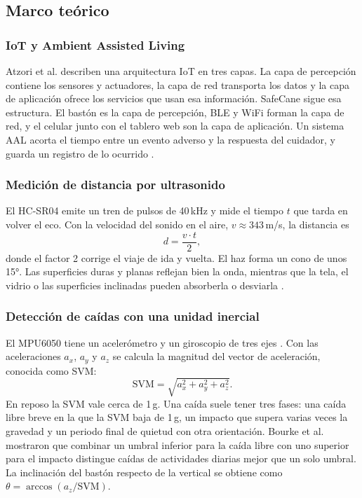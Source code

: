\documentclass[conference,a4paper]{IEEEtran}
\begin{document}
\subsection{Marco teórico}

\subsubsection{IoT y Ambient Assisted Living}
Atzori et al. \cite{atzori} describen una arquitectura IoT en tres capas. La capa de percepción contiene los sensores y actuadores, la capa de red transporta los datos y la capa de aplicación ofrece los servicios que usan esa información. SafeCane sigue esa estructura. El bastón es la capa de percepción, BLE y WiFi forman la capa de red, y el celular junto con el tablero web son la capa de aplicación. Un sistema AAL acorta el tiempo entre un evento adverso y la respuesta del cuidador, y guarda un registro de lo ocurrido \cite{tsantikidou}.

\subsubsection{Medición de distancia por ultrasonido}
El HC-SR04 emite un tren de pulsos de 40\,kHz y mide el tiempo $t$ que tarda en volver el eco. Con la velocidad del sonido en el aire, $v \approx 343$\,m/s, la distancia es
\begin{equation}
d = \frac{v \cdot t}{2},
\label{eq:distancia}
\end{equation}
donde el factor 2 corrige el viaje de ida y vuelta. El haz forma un cono de unos 15°. Las superficies duras y planas reflejan bien la onda, mientras que la tela, el vidrio o las superficies inclinadas pueden absorberla o desviarla \cite{abuelmakarem}.

\subsubsection{Detección de caídas con una unidad inercial}
El MPU6050 tiene un acelerómetro y un giroscopio de tres ejes \cite{mpu6050}. Con las aceleraciones $a_x$, $a_y$ y $a_z$ se calcula la magnitud del vector de aceleración, conocida como SVM:
\begin{equation}
\mathrm{SVM} = \sqrt{a_x^2 + a_y^2 + a_z^2}.
\label{eq:svm}
\end{equation}
En reposo la SVM vale cerca de 1\,g. Una caída suele tener tres fases: una caída libre breve en la que la SVM baja de 1\,g, un impacto que supera varias veces la gravedad y un periodo final de quietud con otra orientación. Bourke et al. \cite{bourke} mostraron que combinar un umbral inferior para la caída libre con uno superior para el impacto distingue caídas de actividades diarias mejor que un solo umbral. La inclinación del bastón respecto de la vertical se obtiene como $\theta = \arccos(a_z/\mathrm{SVM})$.
\end{document}
